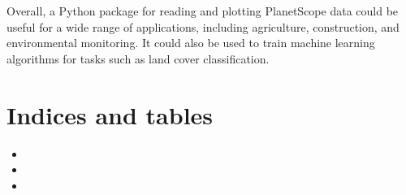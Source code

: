 \documentclass[letterpaper,10pt,english]{sphinxmanual}
\begin{document}
\sphinxAtStartPar
Overall, a Python package for reading and plotting PlanetScope data could be useful for a wide range of applications, including agriculture, construction, and environmental monitoring. It could also be used to train machine learning algorithms for tasks such as land cover classification.


\chapter{Indices and tables}
\label{\detokenize{index:indices-and-tables}}\begin{itemize}
\item {} 
\sphinxAtStartPar
{}

\item {} 
\sphinxAtStartPar
{}

\item {} 
\sphinxAtStartPar
{}

\end{itemize}
\end{document}
